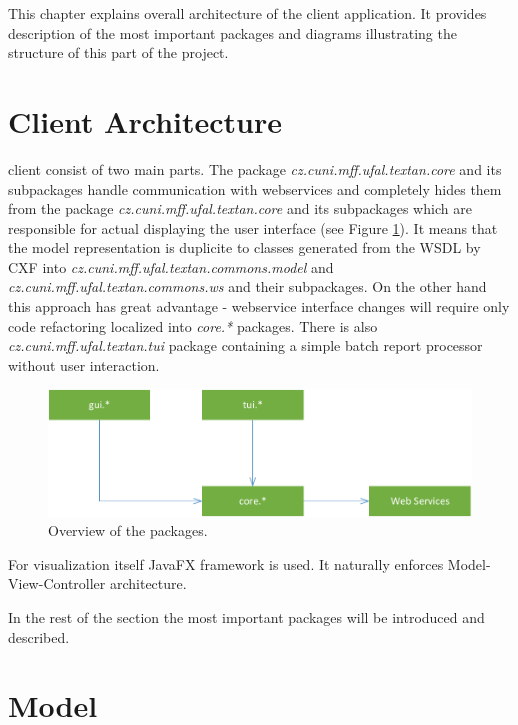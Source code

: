 
This chapter explains overall architecture of the \textan{} client application.
It provides description of the most important packages and diagrams illustrating
the structure of this part of the project.

\section{Client Architecture}
\textan{} client consist of two main parts. The package
\emph{cz.cuni.mff.ufal.textan.core} and its subpackages handle communication
with webservices and completely hides them from the package
\emph{cz.cuni.mff.ufal.textan.core} and its subpackages which are responsible
for actual displaying the user interface (see Figure \ref{fig:ClientOverview}).
It means that the model representation is duplicite to classes generated from
the WSDL by CXF into \emph{cz.\-cuni.\-mff.\-ufal.\-textan.\-commons.\-model}
and \emph{cz.\-cuni.\-mff.\-ufal.\-textan.\-commons.\-ws} and their subpackages.
On the other hand this approach has great advantage - webservice interface
changes will require only code refactoring localized into \emph{core.*}
packages. There is also \emph{cz.\-cuni.\-mff.\-ufal.\-textan.\-tui} package
containing a simple batch report processor without user interaction.

\begin{figure}[!htb]
        \centering
        \includegraphics[width=\textwidth]{Images/ClientOverview}
        \caption{Overview of the packages.}
        \label{fig:ClientOverview}
\end{figure}

For visualization itself JavaFX framework is used. It naturally enforces
Model-View-Controller architecture.

In the rest of the section the most important packages will be introduced and
described.

\section{Model}

